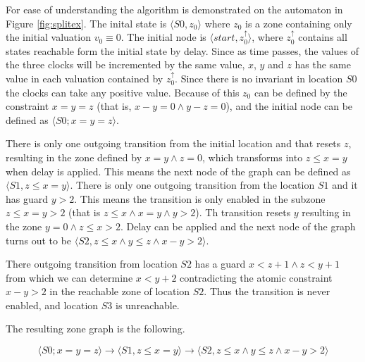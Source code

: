 \begin{example}
	


For ease of understanding the algorithm is demonstrated on the automaton in Figure \ref{fig:splitex}. The inital state is  $\langle S0, z_0 \rangle$ where $z_0$ is a zone containing only the initial valuation $v_0 \equiv 0$. The initial node is  $\langle start, z_0^\uparrow  \rangle$, where $z_0^\uparrow$ contains all states reachable form the initial state by delay. Since as time passes, the values of the three clocks will be incremented by the same value, $x$, $y$ and $z$ has the same value in each valuation contained by $z_0^\uparrow$. Since there is no invariant in location $S0$ the clocks can take any positive value. Because of this $z_0$ can be defined by the constraint $x=y=z$ (that is, $x-y = 0 \wedge y-z=0 $), and the initial node can be defined as $\langle S0; x=y=z  \rangle$.

There is only one outgoing transition from the initial location and that resets $z$, resulting in the zone defined by $x=y \wedge z=0$, which transforms into $z \leq x=y$ when delay is applied. This means the next node of the graph can be defined as $\langle S1, z \leq x=y \rangle$. There is only one outgoing transition from the location $S1$ and it has guard $y>2$. This means the transition is only enabled in the subzone $z \leq x=y>2$ (that is $z \leq x \wedge x=y \wedge y>2$). Th transition resets $y$ resulting in the zone $y=0 \wedge z \leq x > 2$. Delay can be applied and the next node of the graph turns out to be $\langle S2, z \leq x \wedge y \leq z \wedge x-y>2 \rangle$.

There outgoing transition from location $S2$ has a guard $x<z+1 \wedge z<y+1$ from which we can determine $x<y+2$ contradicting the atomic constraint $x-y>2$ in the reachable zone of location $S2$. Thus the transition is never enabled, and location $S3$ is unreachable.  


The resulting zone graph is the following.

	\[\langle S0; x=y=z  \rangle \rightarrow \langle S1, z \leq x=y \rangle \rightarrow \langle S2, z \leq x \wedge y \leq z \wedge x-y>2 \rangle \]

\end{example}

